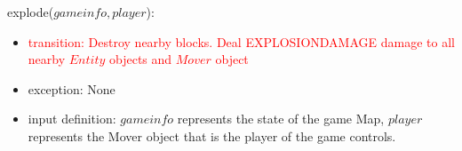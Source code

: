 \documentclass[12pt]{article}
\newcommand{\Implies}{\Rightarrow}
\newcommand{\m}[1]{\mbox{#1}}
\begin{document}
\noindent explode($gameinfo, player$):
\begin{itemize}
    \item \textcolor{red}{transition: Destroy nearby blocks. Deal EXPLOSIONDAMAGE damage to all nearby $Entity$ objects and $Mover$ object}
    \item exception: None
    \item input definition: $gameinfo$ represents the state of the game Map, $player$ represents the Mover object that is the player of the game controls.
\end{itemize}





\end{document}
